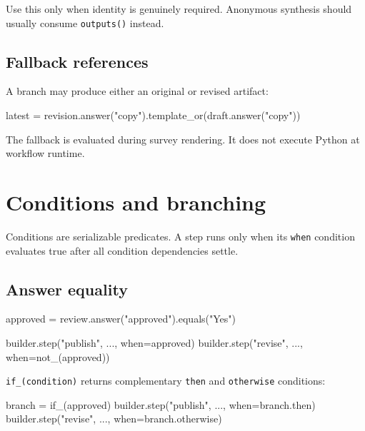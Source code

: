 \documentclass[
  10pt,
]{report}
\newenvironment{Shaded}{}{}
\newcommand{\NormalTok}[1]{#1}
\newcommand{\OperatorTok}[1]{\textcolor[rgb]{0.40,0.40,0.40}{#1}}
\newcommand{\StringTok}[1]{\textcolor[rgb]{0.25,0.44,0.63}{#1}}
\begin{document}
Use this only when identity is genuinely required. Anonymous synthesis
should usually consume \texttt{outputs()} instead.

\section{Fallback references}\label{fallback-references}

A branch may produce either an original or revised artifact:

\begin{Shaded}
\begin{Highlighting}[]
\NormalTok{latest }\OperatorTok{=}\NormalTok{ revision.answer(}\StringTok{"copy"}\NormalTok{).template\_or(draft.answer(}\StringTok{"copy"}\NormalTok{))}
\end{Highlighting}
\end{Shaded}

The fallback is evaluated during survey rendering. It does not execute
Python at workflow runtime.

\chapter{Conditions and branching}\label{conditions-and-branching}

Conditions are serializable predicates. A step runs only when its
\texttt{when} condition evaluates true after all condition dependencies
settle.

\section{Answer equality}\label{answer-equality}

\begin{Shaded}
\begin{Highlighting}[]
\NormalTok{approved }\OperatorTok{=}\NormalTok{ review.answer(}\StringTok{"approved"}\NormalTok{).equals(}\StringTok{"Yes"}\NormalTok{)}

\NormalTok{builder.step(}\StringTok{"publish"}\NormalTok{, ..., when}\OperatorTok{=}\NormalTok{approved)}
\NormalTok{builder.step(}\StringTok{"revise"}\NormalTok{, ..., when}\OperatorTok{=}\NormalTok{not\_(approved))}
\end{Highlighting}
\end{Shaded}

\texttt{if\_(condition)} returns complementary \texttt{then} and
\texttt{otherwise} conditions:

\begin{Shaded}
\begin{Highlighting}[]
\NormalTok{branch }\OperatorTok{=}\NormalTok{ if\_(approved)}
\NormalTok{builder.step(}\StringTok{"publish"}\NormalTok{, ..., when}\OperatorTok{=}\NormalTok{branch.then)}
\NormalTok{builder.step(}\StringTok{"revise"}\NormalTok{, ..., when}\OperatorTok{=}\NormalTok{branch.otherwise)}
\end{Highlighting}
\end{Shaded}
\end{document}

